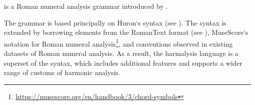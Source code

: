  is a Roman numeral analysis grammar
introduced by \textcite{napoleslopez2020harmalysis}.

The  grammar is based principally on
Huron‘s  syntax (see ). The syntax
is extended by borrowing elements from the RomanText format
(see ), MuseScore‘s notation for Roman
numeral
analysis\footnote{\href{https://musescore.org/en/handbook/3/chord-symbols}{https://musescore.org/en/handbook/3/chord-symbols}},
and conventions observed in existing datasets of Roman
numeral analysis.  As  a result,  the harmalysis language is
a superset  of  the  syntax,  which includes
additional features and supports a wider range of customs of
harmonic analysis.
